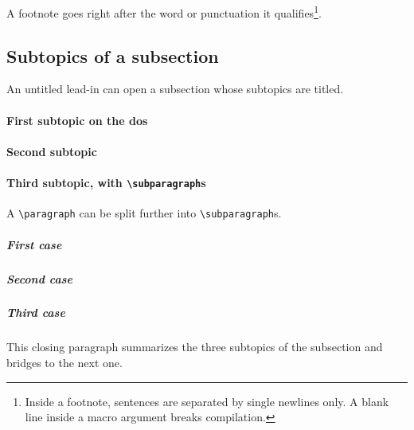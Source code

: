 \documentclass[../main]{subfiles}
\begin{document}
\lipsum[4][1-5]
A footnote goes right after the word or punctuation it qualifies\footnote{Inside a footnote, sentences are separated by single newlines only.
A blank line inside a macro argument breaks compilation.}.

\subsection{Subtopics of a subsection}
\label{sec:subtopics}
An untitled lead-in can open a subsection whose subtopics are titled.
\lipsum[5][1-3]

\paragraph{First subtopic on the \acrshort{dos}}
\lipsum[6][1-6]

\paragraph{Second subtopic}
\lipsum[7][1-6]

\paragraph{Third subtopic, with \texttt{\textbackslash subparagraph}s}
A \verb|\paragraph| can be split further into \verb|\subparagraph|s.

\subparagraph{First case}
\lipsum[8][1-4]

\subparagraph{Second case}
\lipsum[9][1-4]

\subparagraph{Third case}
\lipsum[10][1-4]

\subsectionclose
This closing paragraph summarizes the three subtopics of the subsection and bridges to the next one.
\lipsum[11][1-3]
\end{document}

